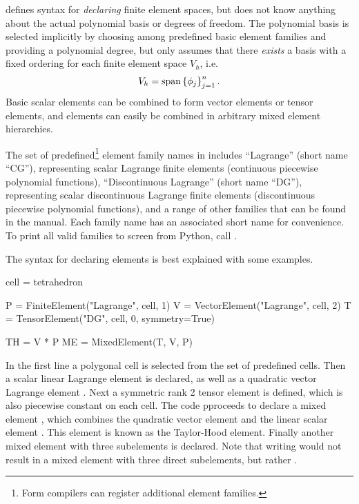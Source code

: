 \ufl{} defines syntax for \emph{declaring} finite element spaces, but
does not know anything about the actual polynomial basis or degrees of
freedom. The polynomial basis is selected implicitly by choosing among
predefined basic element families and providing a polynomial degree,
but \ufl{} only assumes that there \emph{exists} a basis with a fixed
ordering for each finite element space $V_h$, i.e.
\begin{align}
V_h = \operatorname{span}\left\{ \phi_j \right\}_{j=1}^{n}.
\end{align}
Basic scalar elements can be combined to form vector elements or
tensor elements, and elements can easily be combined in arbitrary
mixed element hierarchies.

The set of predefined\footnote{Form compilers can register additional
  element families.}  element family names in \ufl{} includes
``Lagrange'' (short name ``CG''), representing scalar Lagrange finite
elements (continuous piecewise polynomial functions), ``Discontinuous
Lagrange'' (short name ``DG''), representing scalar discontinuous
Lagrange finite elements (discontinuous piecewise polynomial
functions), and a range of other families that can be found in the
manual.  Each family name has an associated short name for
convenience.  To print all valid families to screen from Python, call
.

The syntax for declaring elements is best explained with some
examples.
\begin{python}
cell = tetrahedron

P = FiniteElement("Lagrange", cell, 1)
V = VectorElement("Lagrange", cell, 2)
T = TensorElement("DG", cell, 0, symmetry=True)

TH = V * P
ME = MixedElement(T, V, P)
\end{python}
In the first line a polygonal cell is selected from the set of
predefined cells.  Then a scalar linear Lagrange element
 is declared, as well as a quadratic vector Lagrange element
.  Next a symmetric rank 2 tensor element  is
defined, which is also piecewise constant on each cell.  The code
pproceeds to declare a mixed element , which combines the
quadratic vector element  and the linear scalar element
. This element is known as the Taylor-Hood element.  Finally
another mixed element with three subelements is declared. Note that
writing  would not result in a mixed element with
three direct subelements, but rather
.

